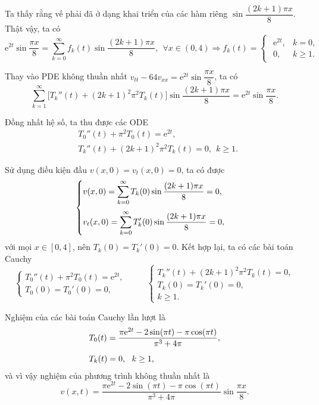\documentclass[10pt, a4paper]{article}
\begin{document}
	Ta thấy rằng vế phải đã ở dạng khai triển của các hàm riêng $\sin\dfrac{(2k+1)\pi x}{8}$. Thật vậy, ta có $$\mathrm e^{2t}\sin\dfrac{\pi x}{8}=\sum_{k=0}^\infty f_k(t)\sin\dfrac{(2k+1)\pi x}{8},~~\forall x\in(0,4)\Rightarrow f_k(t)=\begin{cases}
		\begin{array}{ll}
			\mathrm e^{2t}, & k=0, \\
			0, & k\ge1.
		\end{array}
	\end{cases}$$
	
	Thay vào PDE không thuần nhất $v_{tt}-64v_{xx}=\mathrm e^{2t}\sin\dfrac{\pi x}{8}$, ta có $$\sum_{k=1}^\infty\big[T_k''(t)+(2k+1)^2\pi^2T_k(t)\big]\sin\frac{(2k+1)\pi x}{8}=\mathrm e^{2t}\sin\dfrac{\pi x}{8}.$$
	
	Đồng nhất hệ số, ta thu được các ODE \begin{align*}
		&T_0''(t)+\pi^2T_0(t)=\mathrm e^{2t},\\
		&T_k''(t)+(2k+1)^2\pi^2T_k(t)=0,~~k\ge1.
	\end{align*}
	
	Sử dụng điều kiện đầu $v(x,0)=v_t(x,0)=0$, ta có được $$\begin{cases}
		v(x,0)=\displaystyle\sum_{k=0}^\infty T_k(0)\sin\frac{(2k+1)\pi x}{8}=0,\\
		\noalign{\vskip7pt}
		v_t(x,0)=\displaystyle\sum_{k=0}^\infty T_k'(0)\sin\frac{(2k+1)\pi x}{8}=0,
	\end{cases}$$
	với mọi $x\in[0,4]$, nên $T_k(0)=T_k'(0)=0$. Kết hợp lại, ta có các bài toán Cauchy $$\begin{cases}
		T_0''(t)+\pi^2T_0(t)=\mathrm e^{2t},\\
		T_0(0)=T_0'(0)=0,
	\end{cases}\hspace{1cm}\begin{cases}
		T_k''(t)+(2k+1)^2\pi^2T_k(t)=0,\\
		T_k(0)=T_k'(0)=0,\\
		k\ge1.
	\end{cases}$$
	
	Nghiệm của các bài toán Cauchy lần lượt là \begin{align*}
		&T_0(t)=\frac{\pi\mathrm e^{2t}-2\sin(\pi t)-\pi\cos(\pi t)}{\pi^3+4\pi},\\
		\noalign{\vskip5pt}
		&T_k(t)=0,~~k\ge1,
	\end{align*}
	và vì vậy nghiệm của phương trình không thuần nhất là $$v(x,t)=\frac{\pi\mathrm e^{2t}-2\sin(\pi t)-\pi\cos(\pi t)}{\pi^3+4\pi}\sin\frac{\pi x}{8}.$$
	
\end{document}
